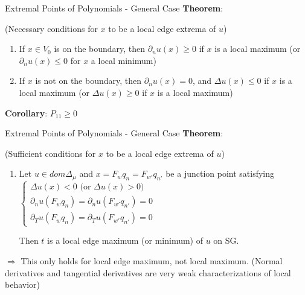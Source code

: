 \documentclass[xcolor = dvipsnames]{beamer}
\newcommand{\lap}{\Delta}
\begin{document}
\begin{frame}{Extremal Points of Polynomials - General Case}
    \textbf{Theorem}: 
    
    (Necessary conditions for $x$ to be a local edge extrema of $u$)
    
    \begin{enumerate}
        \item If $x\in V_{0}$ is on the boundary, then $\partial_{n}u(x)\geq 0$ if $x$ is a local maximum (or $\partial_{n}u(x)\leq 0$ for $x$ a local minimum)
        \vspace{10pt}
        \item If $x$ is not on the boundary, then $\partial_{n}u(x)=0$, and $\lap u(x)\leq 0$ if $x$ is a local maximum (or $\lap u(x)\geq 0$ if $x$ is a local maximum)
    \end{enumerate}
    
    \vspace{10pt}
    
    \textbf{Corollary}: $P_{11}\geq 0$ 
\end{frame}

\begin{frame}{Extremal Points of Polynomials - General Case}
    \textbf{Theorem}: 
    
    (Sufficient conditions for $x$ to be a local edge extrema of $u$)
    \begin{enumerate}
        \item Let $u\in dom\lap_{\mu}$ and $x=F_{w}q_{n}=F_{w'}q_{n'}$ be a junction point satisfying $\begin{cases}
            \lap u(x)<0 \text{ (or } \lap u(x)>0) \\
            \partial_{n}u(F_{w}q_{n})=\partial_{n}u(F_{w'}q_{n'})=0 \\
            \partial_{T}u(F_{w}q_{n})=\partial_{T}u(F_{w'}q_{n'})=0
        \end{cases}$
        
        
        Then $t$ is a local edge maximum (or minimum) of $u$ on SG.
    \end{enumerate}    
    
    \vspace{10pt}
    
    $\Rightarrow$ This only holds for local edge maximum, not local maximum. (Normal derivatives and tangential derivatives are very weak characterizations of local behavior)
\end{frame}
\end{document}
